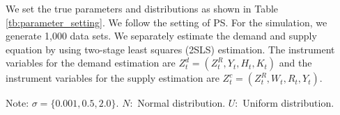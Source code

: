\documentclass[11pt, a4paper]{article}
\begin{document}
We set the true parameters and distributions as shown in Table \ref{tb:parameter_setting}. 
We follow the setting of PS. For the simulation, we generate 1,000 data sets.
We separately estimate the demand and supply equation by using two-stage least squares (2SLS) estimation.
The instrument variables for the demand estimation are $Z^{d}_{t} = (Z^{R}_{t}, Y_t, H_{t}, K_{t})$ and the instrument variables for the supply estimation are $Z^{c}_{t} = (Z^{R}_{t}, W_{t}, R_{t}, Y_t)$. 

\begin{table}[!htbp]
    \caption{True parameters and distributions}
    \label{tb:parameter_setting}
    \begin{center}
    \end{center}
    \footnotesize
    Note: $\sigma=\{0.001, 0.5, 2.0\}$. $N:$ Normal distribution. $U:$ Uniform distribution.
\end{table}
\end{document}
